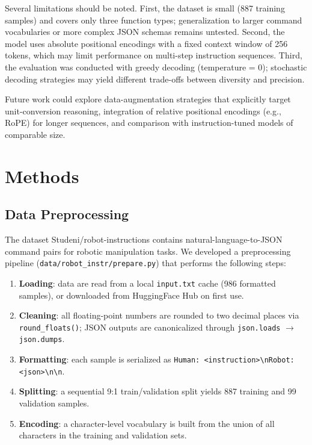 \documentclass[11pt,a4paper]{article}
\begin{document}
Several limitations should be noted.
First, the dataset is small (887 training samples) and covers only three function types;
generalization to larger command vocabularies or more complex JSON schemas remains untested.
Second, the model uses absolute positional encodings with a fixed context window of 256 tokens,
which may limit performance on multi-step instruction sequences.
Third, the evaluation was conducted with greedy decoding (temperature = 0);
stochastic decoding strategies may yield different trade-offs between diversity and precision.

Future work could explore data-augmentation strategies that explicitly target unit-conversion reasoning,
integration of relative positional encodings (e.g., RoPE) for longer sequences,
and comparison with instruction-tuned models of comparable size.

\section{Methods}

\subsection{Data Preprocessing}

The dataset Studeni/robot-instructions contains natural-language-to-JSON command pairs
for robotic manipulation tasks.
We developed a preprocessing pipeline (\texttt{data/robot\_instr/prepare.py}) that performs the following steps:

\begin{enumerate}[leftmargin=*,nosep]
    \item \textbf{Loading}: data are read from a local \texttt{input.txt} cache (986 formatted samples),
          or downloaded from HuggingFace Hub on first use.
    \item \textbf{Cleaning}: all floating-point numbers are rounded to two decimal places via \texttt{round\_floats()};
          JSON outputs are canonicalized through \texttt{json.loads} $\to$ \texttt{json.dumps}.
    \item \textbf{Formatting}: each sample is serialized as
          \texttt{Human: \textless{}instruction\textgreater{}\textbackslash nRobot: \textless{}json\textgreater\textbackslash n\textbackslash n}.
    \item \textbf{Splitting}: a sequential 9:1 train/validation split yields 887 training and 99 validation samples.
    \item \textbf{Encoding}: a character-level vocabulary is built from the union of all characters in the training and validation sets.
\end{enumerate}
\end{document}
